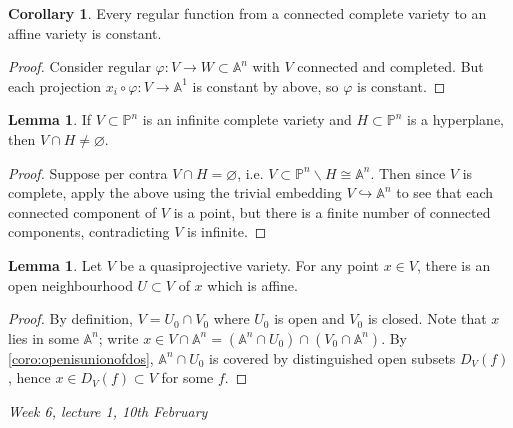 \documentclass{article}
\newcommand{\A}{\mathbb{A}}
\newcommand{\p}{\mathbb{P}}
\theoremstyle{definition}
\newtheorem{lemma}[defn]{Lemma}
\newtheorem{coro}[defn]{Corollary}
\begin{document}
\begin{coro}
Every regular function from a connected complete variety to an affine variety is constant.
\end{coro}
\begin{proof}
Consider regular $\varphi:V\rightarrow W\subset\A^n$ with $V$ connected and completed. But each projection $x_i\circ\varphi:V\rightarrow\A^1$ is constant by above, so $\varphi$ is constant.
\end{proof}

\begin{lemma}
If $V\subset\p^n$ is an infinite complete variety and $H\subset\p^n$ is a hyperplane, then $V\cap H\neq\varnothing$. 
\end{lemma}
\begin{proof}
Suppose per contra $V\cap H=\varnothing$, i.e. $V\subset\p^n\backslash H\cong\A^n$. Then since $V$ is complete, apply the above using the trivial embedding $V\hookrightarrow\A^n$ to see that each connected component of $V$ is a point, but there is a finite number of connected components, contradicting $V$ is infinite.
\end{proof}

\begin{lemma}
Let $V$ be a quasiprojective variety. For any point $x\in V$, there is an open neighbourhood $U\subset V$ of $x$ which is affine.
\end{lemma}
\begin{proof}
By definition, $V=U_0\cap V_0$ where $U_0$ is open and $V_0$ is closed. Note that $x$ lies in some $\A^n$; write $x\in V\cap\A^n=(\A^n\cap U_0)\cap (V_0\cap\A^n)$. By \ref{coro:openisunionofdos}, $\A^n\cap U_0$ is covered by distinguished open subsets $D_V(f)$, hence $x\in D_V(f)\subset V$ for some $f$.
\end{proof}

\begin{flushright}
\textit{Week 6, lecture 1, 10th February}
\end{flushright}
\end{document}
